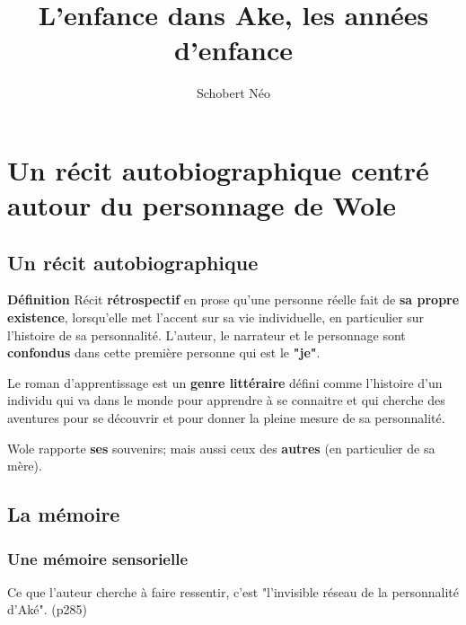 \documentclass[a4paper, 11pt, hidelinks]{article}
\newcommand{\de}{\large \textbf{Définition} \large }
\newcommand{\bs}{\bigskip}
\begin{document}
\title{L'enfance dans Ake, les années d'enfance}
\author{Schobert Néo}

\maketitle

\tableofcontents


\newpage




\section{Un récit autobiographique centré autour du personnage de Wole}


\subsection{Un récit autobiographique}


\de Récit \textbf{rétrospectif} en prose qu'une personne réelle fait de \textbf{sa propre existence}, lorsqu'elle met l'accent sur sa vie individuelle,
en particulier sur l'histoire de sa personnalité.
L'auteur, le narrateur et le personnage sont \textbf{confondus} dans cette première personne qui est le \textbf{"je"}.

\bigskip
Le roman d'apprentissage est un \textbf{genre littéraire} défini comme l'histoire d'un individu qui va dans le monde pour apprendre à se connaitre
et qui cherche des aventures pour se découvrir et pour donner la pleine mesure de sa personnalité.

\smallskip 
Wole rapporte \textbf{ses} souvenirs; mais aussi ceux des \textbf{autres} (en particulier de sa mère).







\subsection{La mémoire}

\subsubsection{Une mémoire sensorielle}



Ce que l'auteur cherche à faire ressentir, c'est "l'invisible réseau de la personnalité d'Aké". (p285)

\bs
\end{document}
